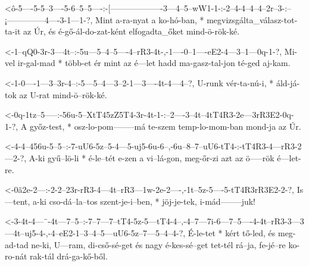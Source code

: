   {<ô-5----5-5--3----5-6--5--5----:-[-------------------3---4--5--wW1-1-:-2--4-4--4--4--2r--3-:--¡--------------4----3-1---1-?,}
  {   Mint a-ra-nyat a ko-hó-ban, * megvizsgálta_válasz-tot-ta-it az  Úr, és é-gő-ál-do-zat-ként elfogadta_őket mind-ö-rök-ké. }


  {<-1--qQ0-3r-3---4t--:-5u---5--4--5----4--rR3-4t-,-1----0--1----eE2-4---3--1---0q-1-?,}
  {  Mi-vel ir-gal-mad * több-et ér mint az é---let  hadd ma-gasz-tal-jon té-ged aj-kam.}

  {<-1-0----1---3--3r-4--:-5---5--4---3--2-1---3----4t-4---4--?,}
  {  U-runk vér-ta-nú-i, * áld-já-tok az U-rat mind-ö--rök-ké.}

  {<-0q-1tz--5-----:-56u-5--XtT45zZ5T4-3r-4t-1-:--2----3--4t--4tT4R3-2e---3rR3E2-0q-1-?,}
  {  A  győz-test, * osz-lo-pom--------má te-szem temp-lo-mom-ban    mond-ja     az Úr.}

  {<-4-4--456u-5--5--:-7-uU6-5z--5-4---5-uj5-6u-6--,-6u--8--7--uU6-tT4-:-tT4R3-4---rR3-2---2-?,}
  {  A-ki gyű--lö-li * é-le--tét e-zen a vi--lá-gon, meg-őr-zi azt az    ö-----rök é---let-re.}



  {<-0ã2e-2---:-2-2--23r-rR3-4---4t--rR3---1w-2e-2----,-1t--5z-5----5-tT4R3rR3E2-2-?,}
  {  Is---tent, a-ki cso-dá--la--tos szent-je-i--ben, * jöj-je-tek, i-mád--------juk!}


  {<-3-4t-4---¨-4t---7--5--:-7--7---7--tT4-5z-5---tT4-4--,-4--7---7i-6---7--5----4-4t--rR3-3---3---4t--uj5-4-,-4--eE2-1--3--4--5---uU6-5z--7---5--4--4-?,}
  {  É-le-tet * kért tő-led, és meg-ad-tad ne-ki, U---ram, di-cső-sé-get és nagy é-kes-sé--get tet-tél rá--ja, fe-jé--re ko-ro-nát rak-tál drá-ga-kő-ből.}

